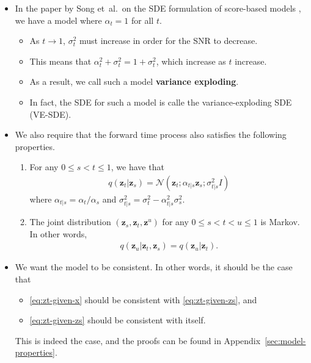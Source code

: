 \documentclass[10pt]{article}
\newcommand{\ve}[1]{\mathbf{#1}}
\newcommand{\etal}{{et~al.}}
\newcommand{\N}{\mathcal{N}}
\begin{document}
\begin{itemize}
  \item In the paper by Song \etal\ on the SDE formulation of score-based models \cite{Song:2020:SDE}, we have a model where $\alpha_t = 1$ for all $t$.
  \begin{itemize}
    \item As $t \rightarrow 1$, $\sigma_t^2$ must increase in order for the SNR to decrease.
    \item This means that $\alpha_t^2 + \sigma_t^2 = 1 + \sigma_t^2$, which increase as $t$ increase.
    \item As a result, we call such a model {\bf variance exploding}.
    \item In fact, the SDE for such a model is calle the variance-exploding SDE (VE-SDE).
  \end{itemize}
  
  \item We also require that the forward time process also satisfies the following properties.
  \begin{enumerate}
    \item For any $0 \leq s < t \leq 1$, we have that
    \begin{align}
      q(\ve{z}_t | \ve{z}_s) = \N(\ve{z}_t ; \alpha_{t|s}\ve{z}_s; \sigma^2_{t|s} I) \label{eq:zt-given-zs}
    \end{align}
    where $\alpha_{t|s} = \alpha_t / \alpha_s$ and $\sigma^2_{t|s} = \sigma_t^2 - \alpha^2_{t|s} \sigma^2_{s}.$

    \item The joint distribution $(\ve{z}_s, \ve{z}_t, \ve{z}^{u})$ for any $0 \leq s < t < u \leq 1$ is Markov. In other words,
    \begin{align*}
      q(\ve{z}_u|\ve{z}_t, \ve{z}_s) = q(\ve{z}_u|\ve{z}_t).
    \end{align*}    
  \end{enumerate}

  \item We want the model to be consistent. In other words, it should be the case that
  \begin{itemize}
    \item \eqref{eq:zt-given-x} should be consistent with \eqref{eq:zt-given-zs}, and
    \item \eqref{eq:zt-given-zs} should be consistent with itself.
  \end{itemize}
  This is indeed the case, and the proofs can be found in Appendix~\ref{sec:model-properties}.


\end{itemize}
\end{document}

